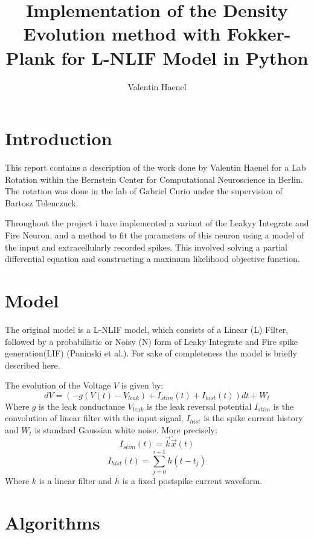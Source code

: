 \documentclass[10pt]{article}
\title{Implementation of the Density Evolution method with
Fokker-Plank for L-NLIF Model in Python}
\author{Valentin Haenel}
\begin{document}
 

\maketitle

\section{Introduction}

This report contains a description of the work done by Valentin Haenel
for a Lab Rotation within the Bernstein Center for Computational
Neuroscience in Berlin. The rotation was done in the lab of Gabriel
Curio under the supervision of Bartosz Telenczuck. 

Throughout the project i have implemented a variant of the Leakyy
Integrate and Fire Neuron, and a method to fit the parameters of this
neuron using a model of the input and extracellularly recorded spikes.
This involved solving a partial differential equation and constructing
a maximum likelihood objective function. 


\section{Model}
The original model is a L-NLIF model, which consists of a Linear
(L) Filter, followed by a probabilistic or Noisy (N) form of Leaky
Integrate and Fire spike generation(LIF) (Paninski et
al.\cite{PaninskiPillowSimoncelli}). For sake of completeness the
model is briefly described here.

The evolution of the Voltage $V$ is given by:
\begin{equation}
    dV = (-g(V(t) -V_{leak}) +I_{stim}(t) + I_{hist}(t)) dt + W_{t}
\end{equation}
Where $g$ is the leak conductance $V_{leak}$ is the leak reversal
potential $I_{stim}$ is the convolution of linear filter with the
input signal, $I_{hist}$ is the spike current history and $W_t$ is
standard Gaussian white noise. More precisely:
\begin{equation}
    I_{stim}(t) = \vec{k} \dot \vec{x}(t)
\end{equation}
\begin{equation}
    I_{hist}(t) = \sum_{j=0}^{i-1}h(t-t_j)
\end{equation}
Where $k$ is a linear filter and $h$ is a fixed postspike current waveform. 

\section{Algorithms}
\end{document}
